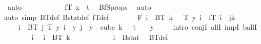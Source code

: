 \begin{isabellebody}
\ auto\isanewline
\ \ \ \ \ \ \ \ \isamarkupfalse%
\ \isamarkupfalse%
\ {\isachardoublequoteopen}fT\ x\ {\isasymin}\ {\isacharbraceleft}{\kern0pt}{\isachardot}{\kern0pt}{\isachardot}{\kern0pt}{\isacharless}{\kern0pt}t{\isacharplus}{\kern0pt}{}{\isacharbraceright}{\kern0pt}{\isachardoublequoteclose}\ \isamarkupfalse%
\ BfS{\isacharunderscore}{\kern0pt}props\ \isamarkupfalse%
\ auto\isanewline
\ \ \ \ \ \ \isamarkupfalse%
\isanewline
\ \ \ \ \isamarkupfalse%
{\isacharparenleft}{\kern0pt}auto\ simp{\isacharcolon}{\kern0pt}\ BT{\isacharunderscore}{\kern0pt}def\ Bstat{\isacharunderscore}{\kern0pt}def\ fT{\isacharunderscore}{\kern0pt}def{\isacharparenright}{\kern0pt}\isanewline
\ \ \ \ \isamarkupfalse%
\ \isamarkupfalse%
\ F{}{\isacharcolon}{\kern0pt}\ {\isachardoublequoteopen}{\isacharparenleft}{\kern0pt}{\isacharparenleft}{\kern0pt}{\isasymforall}i\ {\isasymin}\ BT\ {\isacharparenleft}{\kern0pt}k\ {\isacharplus}{\kern0pt}\ {}{\isacharparenright}{\kern0pt}{\isachardot}{\kern0pt}\ T\ y\ i\ {\isacharequal}{\kern0pt}\ fT\ i{\isacharparenright}{\kern0pt}\ {\isasymand}\ {\isacharparenleft}{\kern0pt}{\isasymforall}j{\isacharless}{\kern0pt}k{\isacharplus}{\kern0pt}{}{\isachardot}{\kern0pt}\isanewline
\ \ \ \ {\isasymforall}i\ {\isasymin}\ BT\ j{\isachardot}{\kern0pt}\ {\isacharparenleft}{\kern0pt}T\ y{\isacharparenright}{\kern0pt}\ i\ {\isacharequal}{\kern0pt}\ y\ j{\isacharparenright}{\kern0pt}{\isacharparenright}{\kern0pt}{\isachardoublequoteclose}\ \ {\isachardoublequoteopen}y\ {\isasymin}\ cube\ {\isacharparenleft}{\kern0pt}k\ {\isacharplus}{\kern0pt}\ {}{\isacharparenright}{\kern0pt}\ {\isacharparenleft}{\kern0pt}t\ {\isacharplus}{\kern0pt}\ {}{\isacharparenright}{\kern0pt}{\isachardoublequoteclose}\ \ y\isanewline
\ \ \ \ \isamarkupfalse%
{\isacharparenleft}{\kern0pt}intro\ conjI\ allI\ impI\ ballI{\isacharparenright}{\kern0pt}\isanewline
\ \ \ \ \ \ \isamarkupfalse%
\ i\ \isamarkupfalse%
\ {\isachardoublequoteopen}i\ {\isasymin}\ BT\ {\isacharparenleft}{\kern0pt}k\ {\isacharplus}{\kern0pt}\ {}{\isacharparenright}{\kern0pt}{\isachardoublequoteclose}\isanewline
\ \ \ \ \ \ \isamarkupfalse%
\ \isamarkupfalse%
\ {\isachardoublequoteopen}i\ {\isasymin}\ Bstat{\isachardoublequoteclose}\ \isamarkupfalse%
\ BT{\isacharunderscore}{\kern0pt}def\ \isamarkupfalse%

\end{isabellebody}
